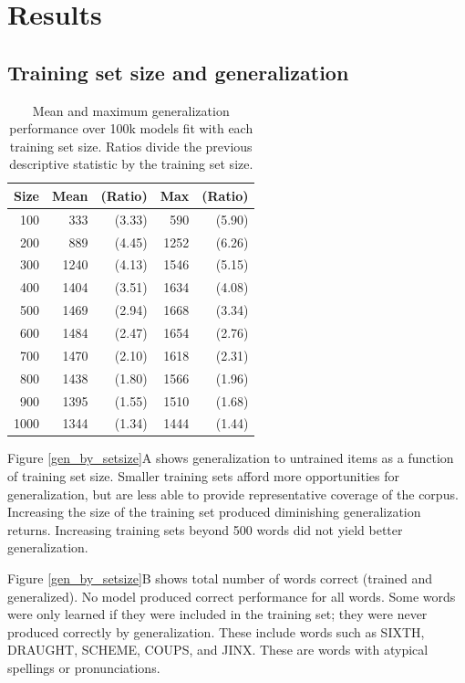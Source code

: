 \documentclass[10pt,letterpaper]{article}
\newcommand{\exword}[1]{\MakeUppercase{#1}}
\begin{document}
\section{Results}

\subsection{Training set size and generalization}
\begin{table}[b]
	\begin{center}
		\begin{tabular}{r r r r r}
			Size & Mean & (Ratio) & Max & (Ratio) \\
			\toprule
			100&333&(3.33)&590&(5.90)\\
			200&889&(4.45)&1252&(6.26)\\
			300&1240&(4.13)&1546&(5.15)\\
			400&1404&(3.51)&1634&(4.08)\\
			500&1469&(2.94)&1668&(3.34)\\
			600&1484&(2.47)&1654&(2.76)\\
			700&1470&(2.10)&1618&(2.31)\\
			800&1438&(1.80)&1566&(1.96)\\
			900&1395&(1.55)&1510&(1.68)\\
			1000&1344&(1.34)&1444&(1.44)\\
		\end{tabular}
		\caption{Mean and maximum generalization performance over 100k models fit with each training set size. Ratios divide the previous descriptive statistic by the training set size.}
	\end{center}
\end{table}

Figure \ref{gen_by_setsize}A shows generalization to untrained items as a function of training set size.  Smaller training sets afford more opportunities for generalization, but are less able to provide representative coverage of the corpus. Increasing the size of the training set produced diminishing generalization returns. Increasing training sets beyond 500 words did not yield better generalization. 

Figure \ref{gen_by_setsize}B shows total number of words correct (trained and generalized). No model produced correct performance for all words. Some words were only learned if they were included in the training set; they were never produced correctly by generalization. These include words such as \exword{sixth}, \exword{draught}, \exword{scheme}, \exword{coups}, and \exword{jinx}. These are words with atypical spellings or pronunciations. 
\end{document}
